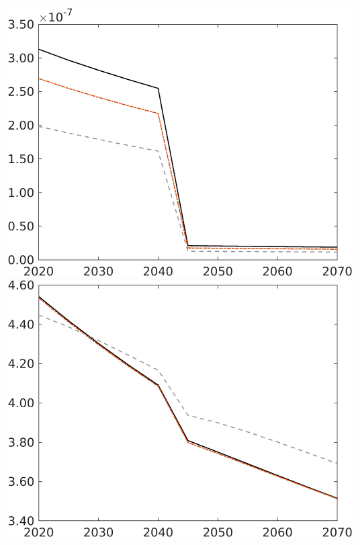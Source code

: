 \begin{figure}[h!!]
\begin{subfigure}{0.9\textwidth}
\begin{minipage}[]{0.32\textwidth}
	\end{minipage}
	\begin{minipage}[]{0.32\textwidth}
		\includegraphics[width=1\textwidth]{../../codding_model/own_basedOnFried/optimalPol_010922_revision/figures/all_13Sept22/CompRed_Taul0_gAf_spillover0_knspil0_nsk0_xgr0_sep0_LFlimit1_emsbase0_countec0_GovRev0_etaa0.79_lgd0.png}
	\end{minipage}
	\begin{minipage}[]{0.32\textwidth}
		\includegraphics[width=1\textwidth]{../../codding_model/own_basedOnFried/optimalPol_010922_revision/figures/all_13Sept22/CompRed_Taul0_gAn_spillover0_knspil0_nsk0_xgr0_sep0_LFlimit1_emsbase0_countec0_GovRev0_etaa0.79_lgd0.png}

\end{minipage}
\end{subfigure}
\end{figure}

